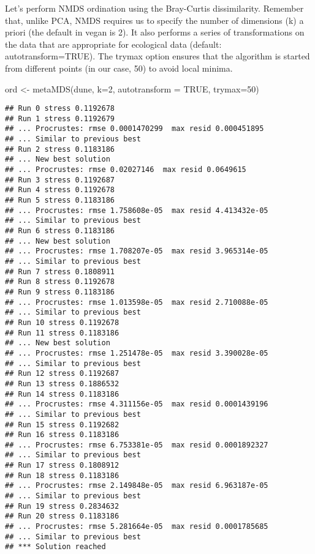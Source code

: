 \documentclass[
]{book}
\newenvironment{Shaded}{\begin{snugshade}}{\end{snugshade}}
\newcommand{\AttributeTok}[1]{\textcolor[rgb]{0.77,0.63,0.00}{#1}}
\newcommand{\ConstantTok}[1]{\textcolor[rgb]{0.00,0.00,0.00}{#1}}
\newcommand{\DecValTok}[1]{\textcolor[rgb]{0.00,0.00,0.81}{#1}}
\newcommand{\FunctionTok}[1]{\textcolor[rgb]{0.00,0.00,0.00}{#1}}
\newcommand{\NormalTok}[1]{#1}
\newcommand{\OtherTok}[1]{\textcolor[rgb]{0.56,0.35,0.01}{#1}}
\begin{document}
Let's perform NMDS ordination using the Bray-Curtis dissimilarity. Remember that, unlike PCA, NMDS requires us to specify the number of dimensions (k) a priori (the default in vegan is 2). It also performs a series of transformations on the data that are appropriate for ecological data (default: autotransform=TRUE). The trymax option ensures that the algorithm is started from different points (in our case, 50) to avoid local minima.

\begin{Shaded}
\begin{Highlighting}[]
\NormalTok{ord }\OtherTok{\textless{}{-}} \FunctionTok{metaMDS}\NormalTok{(dune, }\AttributeTok{k=}\DecValTok{2}\NormalTok{, }\AttributeTok{autotransform =} \ConstantTok{TRUE}\NormalTok{, }\AttributeTok{trymax=}\DecValTok{50}\NormalTok{)}
\end{Highlighting}
\end{Shaded}

\begin{verbatim}
## Run 0 stress 0.1192678 
## Run 1 stress 0.1192679 
## ... Procrustes: rmse 0.0001470299  max resid 0.000451895 
## ... Similar to previous best
## Run 2 stress 0.1183186 
## ... New best solution
## ... Procrustes: rmse 0.02027146  max resid 0.0649615 
## Run 3 stress 0.1192687 
## Run 4 stress 0.1192678 
## Run 5 stress 0.1183186 
## ... Procrustes: rmse 1.758608e-05  max resid 4.413432e-05 
## ... Similar to previous best
## Run 6 stress 0.1183186 
## ... New best solution
## ... Procrustes: rmse 1.708207e-05  max resid 3.965314e-05 
## ... Similar to previous best
## Run 7 stress 0.1808911 
## Run 8 stress 0.1192678 
## Run 9 stress 0.1183186 
## ... Procrustes: rmse 1.013598e-05  max resid 2.710088e-05 
## ... Similar to previous best
## Run 10 stress 0.1192678 
## Run 11 stress 0.1183186 
## ... New best solution
## ... Procrustes: rmse 1.251478e-05  max resid 3.390028e-05 
## ... Similar to previous best
## Run 12 stress 0.1192687 
## Run 13 stress 0.1886532 
## Run 14 stress 0.1183186 
## ... Procrustes: rmse 4.311156e-05  max resid 0.0001439196 
## ... Similar to previous best
## Run 15 stress 0.1192682 
## Run 16 stress 0.1183186 
## ... Procrustes: rmse 6.753381e-05  max resid 0.0001892327 
## ... Similar to previous best
## Run 17 stress 0.1808912 
## Run 18 stress 0.1183186 
## ... Procrustes: rmse 2.149848e-05  max resid 6.963187e-05 
## ... Similar to previous best
## Run 19 stress 0.2834632 
## Run 20 stress 0.1183186 
## ... Procrustes: rmse 5.281664e-05  max resid 0.0001785685 
## ... Similar to previous best
## *** Solution reached
\end{verbatim}
\end{document}
